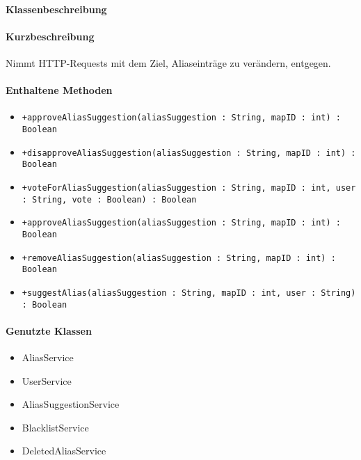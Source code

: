 \paragraph*{Klassenbeschreibung}%
\paragraph*{Kurzbeschreibung}
Nimmt HTTP-Requests mit dem Ziel, Aliaseinträge zu verändern, entgegen.
\paragraph*{Enthaltene Methoden}
\begin{itemize}
    \item \texttt{+approveAliasSuggestion(aliasSuggestion : String, mapID : int) : Boolean}
    \item \texttt{+disapproveAliasSuggestion(aliasSuggestion : String, mapID : int) : Boolean}
    \item \texttt{+voteForAliasSuggestion(aliasSuggestion : String, mapID : int, user : String, vote : Boolean) : Boolean}
    \item \texttt{+approveAliasSuggestion(aliasSuggestion : String, mapID : int) : Boolean}
    \item \texttt{+removeAliasSuggestion(aliasSuggestion : String, mapID : int) : Boolean}
    \item \texttt{+suggestAlias(aliasSuggestion : String, mapID : int, user : String) : Boolean}


\end{itemize}
\paragraph*{Genutzte Klassen}
\begin{itemize}
    \item AliasService
    \item UserService
    \item AliasSuggestionService
    \item BlacklistService
    \item DeletedAliasService
\end{itemize}
